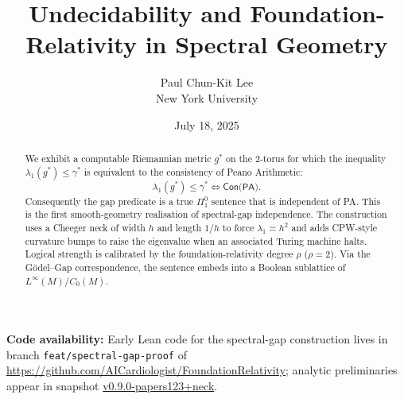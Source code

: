 \documentclass[11pt]{article}
\newcommand{\leanRepoTag}{%
  \href{https://github.com/AICardiologist/FoundationRelativity/tree/v0.9.0-papers123+neck}%
       {v0.9.0-papers123+neck}}
\theoremstyle{definition}\newtheorem{definition}[theorem]{Definition}
\theoremstyle{remark}\newtheorem{remark}[theorem]{Remark}
\begin{document}
\title{Undecidability and Foundation-Relativity in Spectral Geometry}
\author{Paul Chun-Kit Lee \\[0.3em] \small New York University}
\date{July 18, 2025}

\maketitle
\thispagestyle{empty}

\begin{abstract}
We exhibit a computable Riemannian metric $g^{\ast}$ on the 2-torus for
which the inequality $\lambda_{1}(g^{\ast})\le\gamma^{\ast}$ is
equivalent to the consistency of Peano Arithmetic:
\[
    \lambda_{1}(g^{\ast})\le\gamma^{\ast} \Longleftrightarrow
    \textsf{Con(PA)} .
\]
Consequently the gap predicate is a true $\Pi^{0}_{1}$ sentence that is
independent of PA. This is the first smooth-geometry realisation of
spectral-gap independence. The construction uses a Cheeger neck of
width $h$ and length $1/h$ to force $\lambda_{1}\asymp h^{2}$ and
adds CPW-style curvature bumps to raise the eigenvalue when an
associated Turing machine halts. Logical strength is calibrated by the
foundation-relativity degree $\rho$ ($\rho=2$). Via the
Gödel–Gap correspondence, the sentence embeds into a Boolean sublattice
of $L^{\infty}(M)/C_{0}(M)$.
\end{abstract}

\vspace{0.5em}
{\footnotesize \textbf{Code availability:} Early Lean code for the spectral-gap construction lives in branch
\texttt{feat/spectral-gap-proof} of
\url{https://github.com/AICardiologist/FoundationRelativity};
analytic preliminaries appear in snapshot \leanRepoTag.}

\tableofcontents




\end{document}
